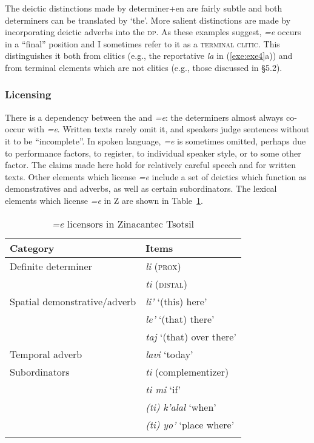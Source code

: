 \documentclass[output=paper,
modfonts
]{LSP/langsci}
\begin{document}
The deictic distinctions made by determiner+en are fairly subtle and both determiners can be translated by  `the'. 
More salient distinctions are made by incorporating deictic adverbs into the \textsc{dp}. 
As these examples suggest, \emph{=e} occurs in a ``final'' position and I sometimes refer to it 
as a \textsc{terminal clitic}. This
distinguishes it both from  clitics (e.g., the reportative  \emph{la} in (\ref{exe:exe4}a)) and from 
terminal elements which are not clitics (e.g., those discussed in \S5.2). 

\subsubsection{Licensing}
There is a dependency between the  and \emph{=e}: 
the determiners almost always co-occur with  \emph{=e}. Written texts rarely omit it, and
speakers judge sentences without it to be ``incomplete''. In spoken language,  \emph{=e} is sometimes omitted, 
perhaps due to performance factors, to register, to individual speaker style, or to some other factor. 
The claims made here hold for relatively careful speech and for written texts. Other elements which license \emph{=e} include
a set of deictics which function as demonstratives and adverbs, as well as certain subordinators. The lexical elements which license \emph{=e} in Z  are shown in Table~\ref{table:licensors}.
\begin{table}
	\begin{tabular} {l l}
		\lsptoprule
		Category & Items \\
		\midrule
		Definite determiner & \emph{li} (\textsc{prox})\\
		& \emph{ti} (\textsc{distal}) \\[1.5ex]
		Spatial demonstrative/adverb  & \emph{li'} `(this) here'\\
		& \emph{le'} `(that) there' \\
		& \emph{taj} `(that) over there'  \\[1.5ex]
		Temporal adverb &  \emph{lavi} `today'  \\[1.5ex]
		Subordinators & \emph{ti} (complementizer) \\
		& \emph{ti mi} `if'\\
		& \emph{(ti) k'alal} `when' \\
		& \emph{(ti) yo'} `place where'  \\
		\lspbottomrule
	\end{tabular}
	\caption{\emph{=e} licensors in Zinacantec Tsotsil}
	\label{table:licensors}
\end{table}
\end{document}
